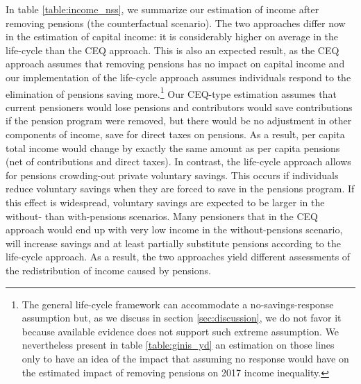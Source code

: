 \documentclass{article}
\begin{document}
In table \ref{table:income_nss}, we summarize our estimation of income after removing pensions  (the counterfactual scenario). The two approaches differ now in the estimation of capital income: it is considerably higher on average in the life-cycle than the CEQ approach. This is also an expected result, as the CEQ approach assumes that removing pensions has no impact on capital income and our implementation of the life-cycle approach assumes individuals respond to the elimination of pensions saving more.\footnote{The general life-cycle framework can accommodate a no-savings-response assumption but, as we discuss in section \ref{sec:discussion}, we do not favor it because available evidence does not support such extreme assumption. We nevertheless present in table \ref{table:ginis_yd} an estimation on those lines only to have an idea of the impact that assuming no response would have on the estimated impact of removing pensions on 2017 income inequality.} Our CEQ-type estimation assumes that current pensioners  would lose pensions and contributors would save contributions if the pension program were removed, but there would be no adjustment in other components of income, save for direct taxes on pensions. As a result, per capita total income would change by exactly the same amount as per capita pensions (net of contributions and direct taxes).  In contrast, the life-cycle approach allows for  pensions crowding-out private voluntary savings. This occurs if individuals reduce voluntary savings when they are forced to save in the pensions program. If this effect is widespread, voluntary savings are expected to  be larger in the without- than with-pensions scenarios. Many pensioners that in the CEQ approach would end up with very low income in the without-pensions scenario, will increase savings and at least partially substitute pensions according to the life-cycle approach. As a result, the two approaches yield different assessments of the redistribution of income caused by pensions.
\end{document}
